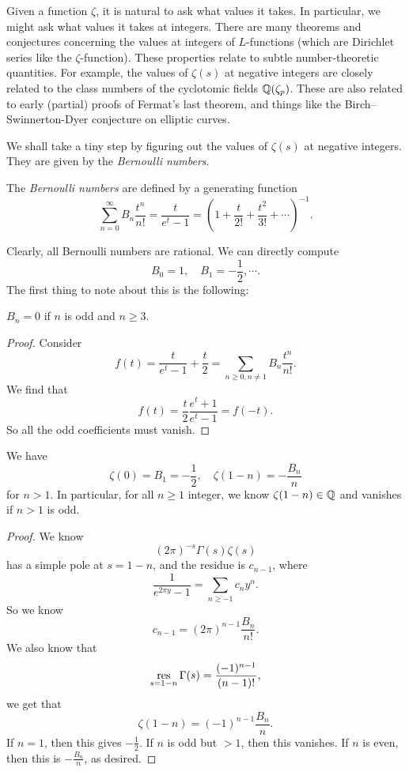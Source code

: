 \documentclass[a4paper]{article}
\begin{document}
Given a function $\zeta$, it is natural to ask what values it takes. In particular, we might ask what values it takes at integers. There are many theorems and conjectures concerning the values at integers of $L$-functions (which are Dirichlet series like the $\zeta$-function). These properties relate to subtle number-theoretic quantities. For example, the values of $\zeta(s)$ at negative integers are closely related to the class numbers of the cyclotomic fields $\mathbb{Q}(\zeta_p)$. These are also related to early (partial) proofs of Fermat's last theorem, and things like the Birch--Swinnerton-Dyer conjecture on elliptic curves.

We shall take a tiny step by figuring out the values of $\zeta(s)$ at negative integers. They are given by the \emph{Bernoulli numbers}.
\begin{defi}
  The \emph{Bernoulli numbers} are defined by a generating function
  \[
    \sum_{n = 0}^\infty B_n \frac{t^n}{n!} = \frac{t}{e^t - 1} = \left(1 + \frac{t}{2!} + \frac{t^2}{3!} + \cdots\right)^{-1}.
  \]
\end{defi}

Clearly, all Bernoulli numbers are rational. We can directly compute
\[
  B_0 = 1, \quad B_1 = -\frac{1}{2}, \cdots.
\]
The first thing to note about this is the following:
\begin{prop}
  $B_n = 0$ if $n$ is odd and $n \geq 3$.
\end{prop}

\begin{proof}
  Consider
  \[
    f(t) = \frac{t}{e^t - 1} + \frac{t}{2} = \sum_{n \geq 0, n \not= 1} B_n \frac{t^n}{n!}.
  \]
  We find that
  \[
    f(t) = \frac{t}{2} \frac{e^t + 1}{e^t - 1} = f(-t).
  \]
  So all the odd coefficients must vanish.
\end{proof}

\begin{cor}
  We have
  \[
    \zeta(0) = B_1 = -\frac{1}{2},\quad \zeta(1 - n)= - \frac{B_n}{n}
  \]
  for $n > 1$. In particular, for all $n \geq 1$ integer, we know $\zeta(1 - n) \in \mathbb{Q}$ and vanishes if $n > 1$ is odd.
\end{cor}

\begin{proof}
  We know
  \[
    (2\pi)^{-s} \Gamma(s) \zeta(s)
  \]
  has a simple pole at $s = 1 - n$, and the residue is $c_{n - 1}$, where
  \[
    \frac{1}{e^{2\pi y} - 1} = \sum_{n \geq -1} c_n y^n.
  \]
  So we know
  \[
    c_{n - 1} = (2\pi)^{n - 1} \frac{B_n}{n!}.
  \]
  We also know that
  \[
    \operatorname*{res}_{s = 1 - n} \Gamma(s) = \frac{(-1)^{n - 1}}{(n - 1)!},
  \]
  we get that
  \[
    \zeta(1 - n) = (-1)^{n - 1} \frac{B_n}{n}.
  \]
  If $n = 1$, then this gives $-\frac{1}{2}$. If $n$ is odd but $> 1$, then this vanishes. If $n$ is even, then this is $-\frac{B_n}{n}$, as desired.
\end{proof}
\end{document}
